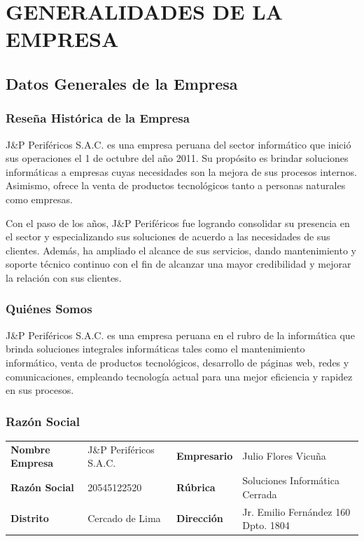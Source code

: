 \chapter[CAPÍTULO I]{GENERALIDADES DE LA EMPRESA}

\section{Datos Generales de la Empresa}

\subsection{Reseña Histórica de la Empresa}
J\&P Periféricos S.A.C. es una empresa peruana del sector informático que inició sus operaciones el 1 de octubre del año 2011. Su propósito es brindar soluciones informáticas a empresas cuyas necesidades son la mejora de sus procesos internos. Asimismo, ofrece la venta de productos tecnológicos tanto a personas naturales como empresas.

Con el paso de los años, J\&P Periféricos fue logrando consolidar su presencia en el sector y especializando sus soluciones de acuerdo a las necesidades de sus clientes. Además, ha ampliado el alcance de sus servicios, dando mantenimiento y soporte técnico continuo con el fin de alcanzar una mayor credibilidad y mejorar la relación con sus clientes.

\subsection{Quiénes Somos}
J\&P Periféricos S.A.C. es una empresa peruana en el rubro de la informática que brinda soluciones integrales informáticas tales como el mantenimiento informático, venta de productos tecnológicos, desarrollo de páginas web, redes y comunicaciones, empleando tecnología actual para una mejor eficiencia y rapidez en sus procesos.

\subsection{Razón Social}
\noindent
\begin{tabular}{@{} p{3.2cm} p{4.5cm} p{2.5cm} p{5.5cm} @{}}
    \textbf{Nombre Empresa} & J\&P Periféricos S.A.C. & \textbf{Empresario} &Julio Flores Vicuña \\[0.5em]
    \textbf{Razón Social}   & 20545122520             & \textbf{Rúbrica}    & Soluciones Informática Cerrada \\[0.5em]
    \textbf{Distrito}       & Cercado de Lima         & \textbf{Dirección}  & \raggedright Jr. Emilio Fernández 160 Dpto. 1804 \\
\end{tabular}

